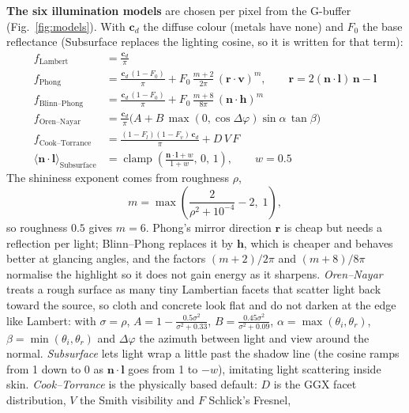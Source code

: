 \documentclass[12pt,a4paper,oneside]{report}
\begin{document}
\textbf{The six illumination models} are chosen per pixel from the G-buffer (Fig.~\ref{fig:models}). With $\mathbf c_d$ the diffuse colour (metals have none) and $F_0$ the base reflectance (Subsurface replaces the lighting cosine, so it is written for that term):
\begin{align}
f_{\text{Lambert}}&=\frac{\mathbf c_d}{\pi}\\[4pt]
f_{\text{Phong}}&=\frac{\mathbf c_d\,(1-F_0)}{\pi}+F_0\,\frac{m+2}{2\pi}\,\left(\mathbf r\!\cdot\!\mathbf v\right)^{m},\qquad \mathbf r=2(\mathbf n\!\cdot\!\mathbf l)\,\mathbf n-\mathbf l\\[4pt]
f_{\text{Blinn--Phong}}&=\frac{\mathbf c_d\,(1-F_0)}{\pi}+F_0\,\frac{m+8}{8\pi}\,\left(\mathbf n\!\cdot\!\mathbf h\right)^{m}\\[4pt]
f_{\text{Oren--Nayar}}&=\frac{\mathbf c_d}{\pi}\Big(A+B\,\max\!\left(0,\cos\Delta\varphi\right)\sin\alpha\,\tan\beta\Big)\\[4pt]
f_{\text{Cook--Torrance}}&=\frac{(1-F_l)(1-F_v)\,\mathbf c_d}{\pi}+D\,V\,F\\[4pt]
\langle\mathbf n\!\cdot\!\mathbf l\rangle_{\text{Subsurface}}&=\operatorname{clamp}\!\left(\frac{\mathbf n\!\cdot\!\mathbf l+w}{1+w},\,0,\,1\right),\qquad w=0.5
\end{align}
The shininess exponent comes from roughness $\rho$,
\begin{equation}m=\max\!\left(\frac{2}{\rho^{2}+10^{-4}}-2,\;1\right),\end{equation}
so roughness $0.5$ gives $m=6$. Phong's mirror direction $\mathbf r$ is cheap but needs a reflection per light; Blinn--Phong replaces it by $\mathbf h$, which is cheaper and behaves better at glancing angles, and the factors $(m+2)/2\pi$ and $(m+8)/8\pi$ normalise the highlight so it does not gain energy as it sharpens. \emph{Oren--Nayar} treats a rough surface as many tiny Lambertian facets that scatter light back toward the source, so cloth and concrete look flat and do not darken at the edge like Lambert: with $\sigma=\rho$, $A=1-\frac{0.5\sigma^2}{\sigma^2+0.33}$, $B=\frac{0.45\sigma^2}{\sigma^2+0.09}$, $\alpha=\max(\theta_i,\theta_r)$, $\beta=\min(\theta_i,\theta_r)$ and $\Delta\varphi$ the azimuth between light and view around the normal. \emph{Subsurface} lets light wrap a little past the shadow line (the cosine ramps from 1 down to 0 as $\mathbf n\!\cdot\!\mathbf l$ goes from 1 to $-w$), imitating light scattering inside skin. \emph{Cook--Torrance} is the physically based default: $D$ is the GGX facet distribution, $V$ the Smith visibility and $F$ Schlick's Fresnel,
\end{document}
